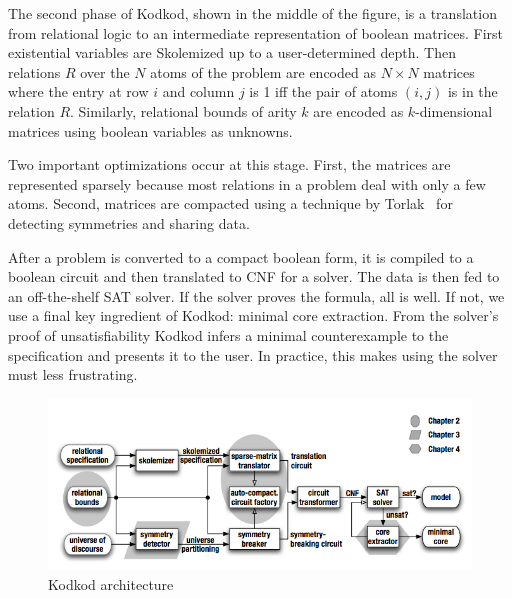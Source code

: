 The second phase of Kodkod, shown in the middle of the figure, is a translation
 from relational logic to an intermediate representation of boolean matrices.
First existential variables are Skolemized up to a user-determined depth.
Then relations $R$ over the $N$ atoms of the problem are encoded as $N \times N$
 matrices where the entry at row $i$ and column $j$ is 1 iff the pair of atoms
 $(i, j)$ is in the relation $R$.
Similarly, relational bounds of arity $k$ are encoded as $k$-dimensional matrices
 using boolean variables as unknowns.

Two important optimizations occur at this stage.
First, the matrices are represented sparsely because most relations in a problem
 deal with only a few atoms.
Second, matrices are compacted using a technique by Torlak~\cite{t-dissertation-2009}
 for detecting symmetries and sharing data.

After a problem is converted to a compact boolean form, it is compiled to a boolean
 circuit and then translated to CNF for a solver.
The data is then fed to an off-the-shelf SAT solver.
If the solver proves the formula, all is well.
If not, we use a final key ingredient of Kodkod: minimal core extraction.
From the solver's proof of unsatisfiability Kodkod infers a minimal counterexample
 to the specification and presents it to the user.
In practice, this makes using the solver must less frustrating.

\begin{figure}
  \label{fig:arch}
  \begin{center}
  \includegraphics[width=12cm]{arch.png}
  \end{center}
  \caption{Kodkod architecture}
\end{figure}


